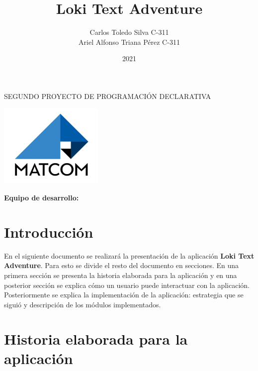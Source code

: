\documentclass[12pt]{article}
\begin{document}
\title{Loki Text Adventure}
\author{Carlos Toledo Silva C-311\\
		    Ariel Alfonso Triana Pérez C-311}
\date{2021}

\makeatletter
\begin{titlepage}
\centering

\vspace{5cm}

{ \Huge \textbf{\@title}}

\vspace{1cm}

SEGUNDO PROYECTO DE PROGRAMACIÓN DECLARATIVA

\vspace{5cm}

\includegraphics[width=5cm]{./img/logo-matcom.jpg}

\vspace{5cm}

\textbf{Equipo de desarrollo:}

 \@author

\vspace{1cm}

\@date
\end{titlepage}
	

	
\section{Introducción}

En el siguiente documento se realizará la presentación de la aplicación \textbf{Loki Text Adventure}. Para esto se divide el resto del documento en secciones. En una primera sección se presenta la historia elaborada para la aplicación y en una posterior sección se explica cómo un usuario puede interactuar con la aplicación. Posteriormente se explica la implementación de la aplicación: estrategia que se siguió y descripción de los módulos implementados.

\section{Historia elaborada para la aplicación}
\end{document}
